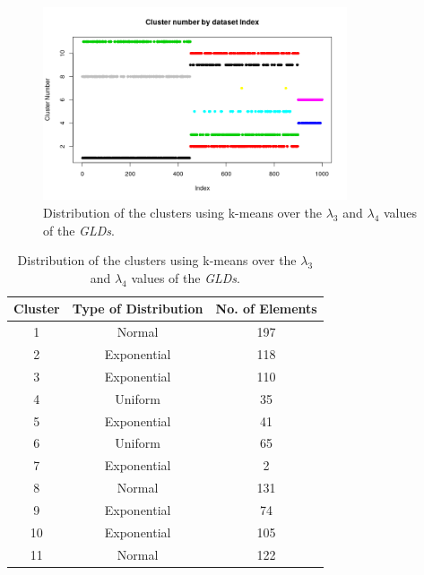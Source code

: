 \begin{figure}[H]
    \centering
    \includegraphics[width=0.8\textwidth]{img/gld_clustering/Dataset1/l3_l4/clusters_by_index.png}
    \caption{Distribution of the clusters using k-means over the $\lambda_{3}$ and $\lambda_{4}$ values of the \textit{GLDs}.}
    \label{fig:dataset1_l3l4}
\end{figure}

\begin{table}[]
\centering
\caption{Distribution of the clusters using k-means over the $\lambda_{3}$ and $\lambda_{4}$ values of the \textit{GLDs}.}
\label{tab:dataset1_l3l4}
\begin{tabular}{|c|c|c|}
\hline
Cluster & Type of Distribution & No. of Elements \\ \hline
1       & Normal          & 197              \\ \hline
2       & Exponential          & 118              \\ \hline
3       & Exponential          & 110             \\ \hline
4       & Uniform               & 35              \\ \hline
5       & Exponential               & 41              \\ \hline
6       & Uniform               & 65             \\ \hline
7       & Exponential              & 2             \\ \hline
8       & Normal          & 131              \\ \hline
9       & Exponential          & 74               \\ \hline
10      & Exponential               & 105              \\ \hline
11      & Normal          & 122              \\ \hline
\end{tabular}
\end{table}
 
